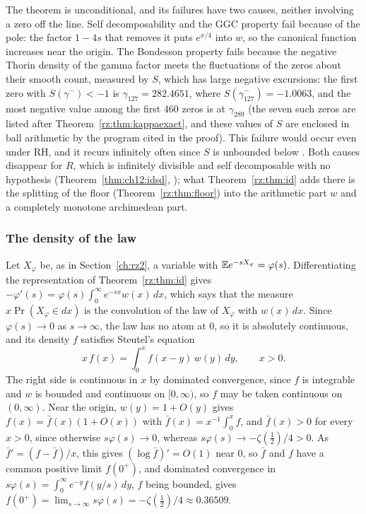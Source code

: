 The theorem is unconditional, and its failures have two causes, neither involving a zero off the line. Self decomposability and the GGC property fail because of the pole: the factor $1-4s$ that removes it puts $e^{x/4}$ into $w$, so the canonical function increases near the origin. The Bondesson property fails because the negative Thorin density of the gamma factor meets the fluctuations of the zeros about their smooth count, measured by $S$, which has large negative excursions: the first zero with $S(\gamma^-)<-1$ is $\gamma_{127}=282.4651$, where $S(\gamma_{127}^-)=-1.0063$, and the most negative value among the first $460$ zeros is at $\gamma_{289}$ (the seven such zeros are listed after Theorem~\ref{rz:thm:kappaexact}, and these values of $S$ are enclosed in ball arithmetic by the program cited in the proof). This failure would occur even under RH, and it recurs infinitely often since $S$ is unbounded below \cite{Selberg46,Tsang}. Both causes disappear for $R$, which is infinitely divisible and self decomposable with no hypothesis (Theorem~\ref{thm:ch12:idsd}, \cite[Theorem A]{P26}); what Theorem~\ref{rz:thm:id} adds there is the splitting of the floor (Theorem~\ref{rz:thm:floor}) into the arithmetic part $w$ and a completely monotone archimedean part.

\subsubsection{The density of the law}

Let $X_\varphi$ be, as in Section~\ref{ch:rz2}, a variable with $\mathbb{E} e^{-sX_\varphi}=\varphi(s)$. Differentiating the representation of Theorem~\ref{rz:thm:id} gives $-\varphi'(s)=\varphi(s)\int_0^\infty e^{-sx}w(x)\,dx$, which says that the measure $x\Pr(X_\varphi\in dx)$ is the convolution of the law of $X_\varphi$ with $w(x)\,dx$. Since $\varphi(s)\to0$ as $s\to\infty$, the law has no atom at $0$, so it is absolutely continuous, and its density $f$ satisfies Steutel's equation \cite[Proposition~III.4.16]{SvH}
\begin{equation}\label{rz:eq:steutel}
x\,f(x)=\int_0^xf(x-y)\,w(y)\,dy,\qquad x>0 .
\end{equation}
The right side is continuous in $x$ by dominated convergence, since $f$ is integrable and $w$ is bounded and continuous on $[0,\infty)$, so $f$ may be taken continuous on $(0,\infty)$. Near the origin, $w(y)=1+O(y)$ gives $f(x)=\bar f(x)(1+O(x))$ with $\bar f(x)=x^{-1}\int_0^xf$, and $\bar f(x)>0$ for every $x>0$, since otherwise $s\varphi(s)\to0$, whereas $s\varphi(s)\to-\zeta(\frac12)/4>0$. As $\bar f'=(f-\bar f)/x$, this gives $(\log\bar f)'=O(1)$ near $0$, so $\bar f$ and $f$ have a common positive limit $f(0^+)$, and dominated convergence in $s\varphi(s)=\int_0^\infty e^{-y}f(y/s)\,dy$, $f$ being bounded, gives $f(0^+)=\lim_{s\to\infty}s\varphi(s)=-\zeta(\frac12)/4\approx0.36509$.

